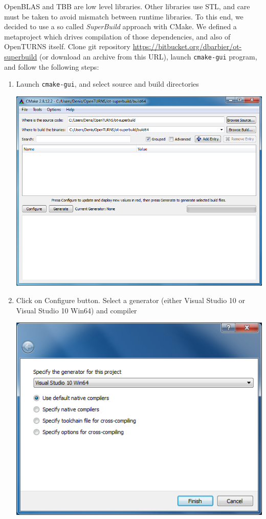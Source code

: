 OpenBLAS and TBB are low level libraries. Other libraries use STL, and care must be taken to avoid mismatch between runtime
libraries.  To this end, we decided to use a so called \emph{SuperBuild} approach with CMake.  We defined a metaproject
which drives compilation of those dependencies, and also of OpenTURNS itself.
Clone git repository \url{https://bitbucket.org/dbarbier/ot-superbuild} (or download an archive from this URL), launch
\texttt{cmake-gui} program, and follow the following steps:
\begin{enumerate}

\item Launch \texttt{cmake-gui}, and select source and build directories
\begin{center}
  \includegraphics[scale=0.5]{Figures/win_native/cmake-gui-start.png}
\end{center}

\item Click on \textsf{Configure} button.  Select a generator (either Visual Studio 10 or Visual Studio 10 Win64) and compiler
\begin{center}
  \includegraphics[scale=0.5]{Figures/win_native/cmake-gui-compiler.png}
\end{center}


\end{enumerate}
